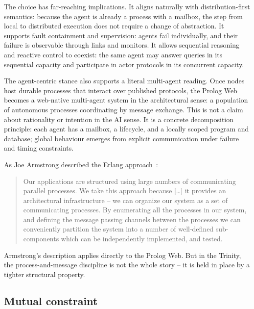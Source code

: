 The choice has far-reaching implications. It aligns naturally with
distribution-first semantics: because the agent is already a process
with a mailbox, the step from local to distributed execution does not
require a change of abstraction. It supports fault containment and
supervision: agents fail individually, and their failure is observable
through links and monitors. It allows sequential reasoning and reactive
control to coexist: the same agent may answer queries in its sequential
capacity and participate in actor protocols in its concurrent capacity.

The agent-centric stance also supports a literal multi-agent reading.
Once nodes host durable processes that interact over published protocols,
the Prolog Web becomes a web-native multi-agent system in the
architectural sense: a population of autonomous processes coordinating by
message exchange. This is not a claim about rationality or intention in
the AI sense. It is a concrete decomposition principle: each agent has a
mailbox, a lifecycle, and a locally scoped program and database; global
behaviour emerges from explicit communication under failure and timing
constraints.

As Joe Armstrong described the Erlang
approach~\cite{DBLP:conf/hopl/Armstrong07}:

\begin{quote}
Our applications are structured using large numbers of communicating
parallel processes. We take this approach because [\ldots] it provides
an architectural infrastructure -- we can organize our system as a set
of communicating processes. By enumerating all the processes in our
system, and defining the message passing channels between the processes
we can conveniently partition the system into a number of well-defined
sub-components which can be independently implemented, and tested.
\end{quote}

\noindent Armstrong's description applies directly to the Prolog Web. But in the Trinity, the process-and-message discipline is not the whole story -- it is held in place by a tighter structural property.

\subsection{Mutual constraint}\label{sec:paradigm-mutual-constraint}

